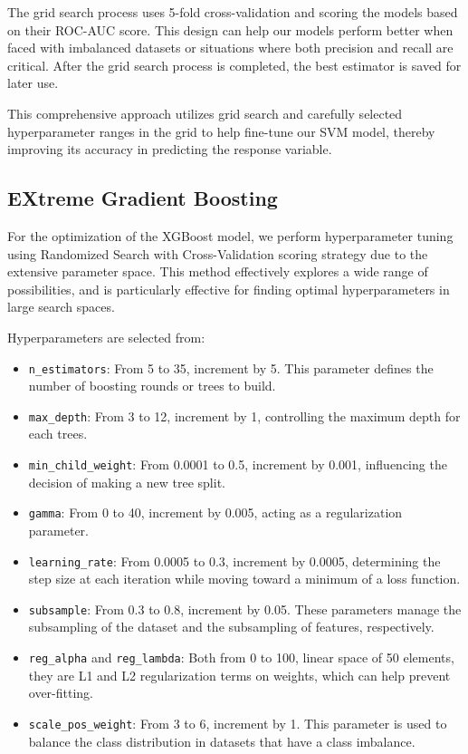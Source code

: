 \documentclass{article}
\begin{document}
The grid search process uses 5-fold cross-validation and scoring the models based on their ROC-AUC score. This design can help our models perform better when faced with imbalanced datasets or situations where both precision and recall are critical. After the grid search process is completed, the best estimator is saved for later use.

This comprehensive approach utilizes grid search and carefully selected hyperparameter ranges in the grid to help fine-tune our SVM model, thereby improving its accuracy in predicting the response variable.

\subsection{EXtreme Gradient Boosting}

For the optimization of the XGBoost model, we perform hyperparameter tuning using Randomized Search with Cross-Validation scoring strategy due to the extensive parameter space. This method effectively explores a wide range of possibilities, and is particularly effective for finding optimal hyperparameters in large search spaces.

Hyperparameters are selected from:

\begin{itemize}
    \item \texttt{n\_estimators}: From 5 to 35, increment by 5. This parameter defines the number of boosting rounds or trees to build.
    \item \texttt{max\_depth}: From 3 to 12, increment by 1, controlling the maximum depth for each trees.
    \item \texttt{min\_child\_weight}: From 0.0001 to 0.5, increment by 0.001, influencing the decision of making a new tree split.
    \item \texttt{gamma}: From 0 to 40, increment by 0.005, acting as a regularization parameter.
    \item \texttt{learning\_rate}: From 0.0005 to 0.3, increment by 0.0005, determining the step size at each iteration while moving toward a minimum of a loss function.
    \item \texttt{subsample}: From 0.3 to 0.8, increment by 0.05. These parameters manage the subsampling of the dataset and the subsampling of features, respectively.
    \item \texttt{reg\_alpha} and \texttt{reg\_lambda}: Both from 0 to 100, linear space of 50 elements, they are L1 and L2 regularization terms on weights, which can help prevent over-fitting.
    \item \texttt{scale\_pos\_weight}: From 3 to 6, increment by 1. This parameter is used to balance the class distribution in datasets that have a class imbalance.
\end{itemize}
\end{document}
